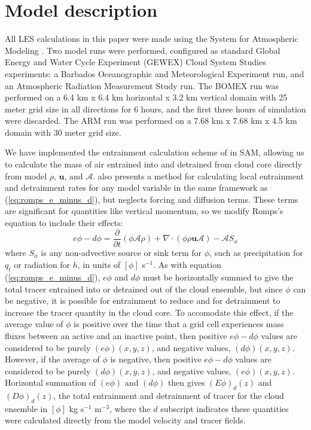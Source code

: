 \documentclass[12pt]{article}
\begin{document}

\section{Model description}

All LES calculations in this paper were made using the System for Atmospheric 
Modeling \citep[SAM;][]{Khairoutdinov2003}.  Two model runs were performed, 
configured as standard Global Energy and Water Cycle Experiment (GEWEX) 
Cloud System Studies \citep[GCSS;][]{Randall2003} experiments: a Barbados 
Oceanographic and Meteorological Experiment \citep[BOMEX;][]{Siebesma2003} run,
and an Atmospheric Radiation Measurement Study \citep[ARM;][]{Brown2002} run. 
The BOMEX run was performed on a 6.4 km x 6.4 km horizontal x 3.2 km vertical 
domain with 25 meter grid size in all directions for 6 hours, and the first 
three hours of simulation were discarded. The ARM run was performed on a 
7.68 km x 7.68 km x 4.5 km domain with 30 meter grid size.

We have implemented the entrainment calculation scheme of \cite{Romps2010} in 
SAM, allowing us to calculate the mass of air entrained into and detrained from
cloud core directly from model $\rho$, $\mathbf{u}$, and $\mathcal{A}$.  
\citet[eq. 4]{Romps2010} also presents a method for calculating local 
entrainment and detrainment rates for any model variable in the same framework 
as (\ref{eq:romps_e_minus_d}), but neglects forcing and diffusion terms.  
These terms are significant for quantities like vertical momentum, so we modify 
Romps's equation to include their effects:
\begin{equation}
  \label{eq:romps_ephi_minus_dphi}
  e\phi - d\phi = \frac{\partial}{\partial t}(\phi \mathcal{A} \rho) 
                + \nabla \cdot (\phi \rho \mathbf{u} \mathcal{A})
                - \mathcal{A}S_\phi
\end{equation}
where $S_\phi$ is any non-advective source or sink term for $\phi$, such as 
precipitation for $q_t$ or radiation for $h$, in units of $[\phi]$ s$^{-1}$.  
As with equation (\ref{eq:romps_e_minus_d}), $e\phi$ and $d\phi$ must be 
horizontally summed to give the total tracer entrained into or detrained out 
of the cloud ensemble, but since $\phi$ can be negative, it is possible for 
entrainment to reduce and for detrainment to increase the tracer quantity 
in the cloud core.  To accomodate this effect, if the average value of $\phi$ 
is positive over the time that a grid cell experiences mass fluxes between an 
active and an inactive point, then positive $e\phi-d\phi$ values are 
considered to be purely $(e\phi)(x,y,z)$, and negative values, $(d\phi)(x,y,z)$.  
However, if the average of $\phi$ is negative, then positive $e\phi-d\phi$ 
values are considered to be purely $(d\phi)(x,y,z)$, and negative values, 
$(e\phi)(x,y,z)$.  Horizontal summation of $(e\phi)$ and $(d\phi)$ then 
gives $(E\phi)_d(z)$ and $(D\phi)_d(z)$, the total entrainment and detrainment 
of tracer for the cloud ensemble in $[\phi]$ kg s$^{-1}$ m$^{-3}$, where the 
$d$ subscript indicates these quantities were calculated directly from the 
model velocity and tracer fields.
\end{document}
